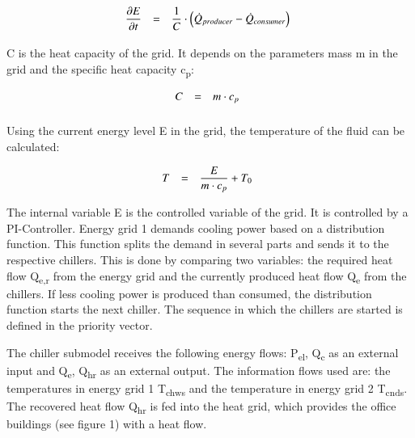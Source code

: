 \documentclass[3p,times,procedia,twocolumn,twoside]{elsarticle}
\begin{document}
\begin{equation}
\begin{array}{@{}lcl}

\displaystyle 
\frac{\partial E}{\partial t} &=& 
\displaystyle 
\frac
{1}
{C}
\cdot \left
(\dot{Q}_{producer} - \dot{Q}_{consumer}\right)
\\[6pt]

\end{array}\vspace*{-12pt}
\end{equation}

C is the heat capacity of the grid. It depends on the parameters mass m in the grid and the specific heat capacity c\textsubscript{p}:

\begin{equation}
\begin{array}{@{}lcl}

\displaystyle 
C &=& 
\displaystyle 
m \cdot c_p
\\[6pt]

\end{array}\vspace*{-12pt}
\end{equation}

Using the current energy level E in the grid, the temperature of the fluid can be calculated:

\begin{equation}
\begin{array}{@{}lcl}

\displaystyle 
T &=& 
\displaystyle 
\frac{E}
{m \cdot c_p}
+ T_0
\\[6pt]

\end{array}\vspace*{-12pt}
\end{equation}

The internal variable E is the controlled variable of the grid. It is controlled by a PI-Controller. Energy grid 1 demands cooling power based on a distribution function. This function splits the demand in several parts and sends it to the respective chillers. This is done by comparing two variables: the required heat flow Q\textsubscript{e,r} from the energy grid and the currently produced heat flow Q\textsubscript{e} from the chillers. If less cooling power is produced than consumed, the distribution function starts the next chiller. The sequence in which the chillers are started is defined in the priority vector. 

The chiller submodel receives the following energy flows: P\textsubscript{el}, Q\textsubscript{c} as an external input and Q\textsubscript{e}, Q\textsubscript{hr} as an external output. The information flows used are: the temperatures in energy grid 1 T\textsubscript{chws} and the temperature in energy grid 2 T\textsubscript{cnds}. The recovered heat flow Q\textsubscript{hr} is fed into the heat grid, which provides the office buildings (see figure 1) with a heat flow.
\end{document}
